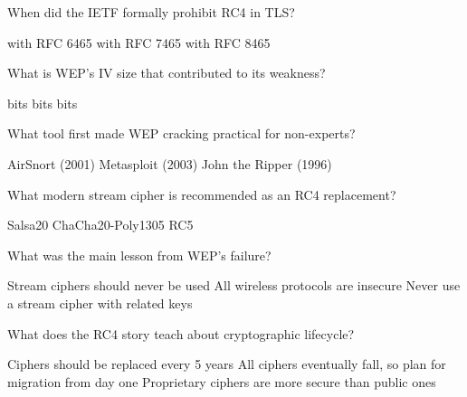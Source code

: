 \documentclass[10pt,a4paper,american]{exam}
\begin{document}
\begin{questions}
	\question When did the IETF formally prohibit RC4 in TLS?
	\begin{randomizechoices}
		 with RFC 6465
		 with RFC 7465
		 with RFC 8465
	\end{randomizechoices}

	\question What is WEP's IV size that contributed to its weakness?
	\begin{randomizechoices}
		 bits
		 bits
		 bits
	\end{randomizechoices}

	\question What tool first made WEP cracking practical for non-experts?
	\begin{randomizechoices}
		\CorrectChoice AirSnort (2001)
		\choice Metasploit (2003)
		\choice John the Ripper (1996)
	\end{randomizechoices}

	\question What modern stream cipher is recommended as an RC4 replacement?
	\begin{randomizechoices}
		\choice Salsa20
		\CorrectChoice ChaCha20-Poly1305
		\choice RC5
	\end{randomizechoices}

	\question What was the main lesson from WEP's failure?
	\begin{randomizechoices}
		\choice Stream ciphers should never be used
		\choice All wireless protocols are insecure
		\CorrectChoice Never use a stream cipher with related keys
	\end{randomizechoices}

	\question What does the RC4 story teach about cryptographic lifecycle?
	\begin{randomizechoices}
		\choice Ciphers should be replaced every 5 years
		\CorrectChoice All ciphers eventually fall, so plan for migration from day one
		\choice Proprietary ciphers are more secure than public ones
	\end{randomizechoices}

\end{questions}

\clearpage

\end{document}

